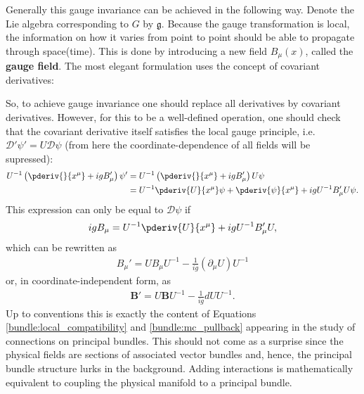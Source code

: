     Generally this gauge invariance can be achieved in the following way. Denote the Lie algebra corresponding to $G$ by $\mathfrak{g}$. Because the gauge transformation is local, the information on how it varies from point to point should be able to propagate through space(time). This is done by introducing a new field $B_\mu(x)$, called the \textbf{gauge field}. The most elegant formulation uses the concept of covariant derivatives:

    So, to achieve gauge invariance one should replace all derivatives by covariant derivatives. However, for this to be a well-defined operation, one should check that the covariant derivative itself satisfies the local gauge principle, i.e. $\mathcal{D}'\psi' = U\mathcal{D}\psi$ (from here the coordinate-dependence of all fields will be supressed):
    \begin{align}
        U^{-1}\left(\pderiv{}{x^\mu} + igB_\mu'\right)\psi' &= U^{-1}\left(\pderiv{}{x^\mu} + igB_\mu'\right)U\psi\nonumber\\
        &= U^{-1}\pderiv{U}{x^\mu}\psi + \pderiv{\psi}{x^\mu} + igU^{-1}B_\mu'U\psi.
    \end{align}
    This expression can only be equal to $\mathcal{D}\psi$ if
    \begin{gather}
        igB_\mu = U^{-1}\pderiv{U}{x^\mu} + igU^{-1}B_\mu'U,
    \end{gather}
    which can be rewritten as
    \begin{gather}
        B_\mu' = UB_\mu U^{-1} - \frac{1}{ig}(\partial_\mu U)U^{-1}
    \end{gather}
    or, in coordinate-independent form, as
    \begin{gather}
        \mathbf{B}' = U\mathbf{B}U^{-1} - \frac{1}{ig}dUU^{-1}.
    \end{gather}
    Up to conventions this is exactly the content of Equations \eqref{bundle:local_compatibility} and \eqref{bundle:mc_pullback} appearing in the study of connections on principal bundles. This should not come as a surprise since the physical fields are sections of associated vector bundles and, hence, the principal bundle structure lurks in the background. Adding interactions is mathematically equivalent to coupling the physical manifold to a principal bundle.

